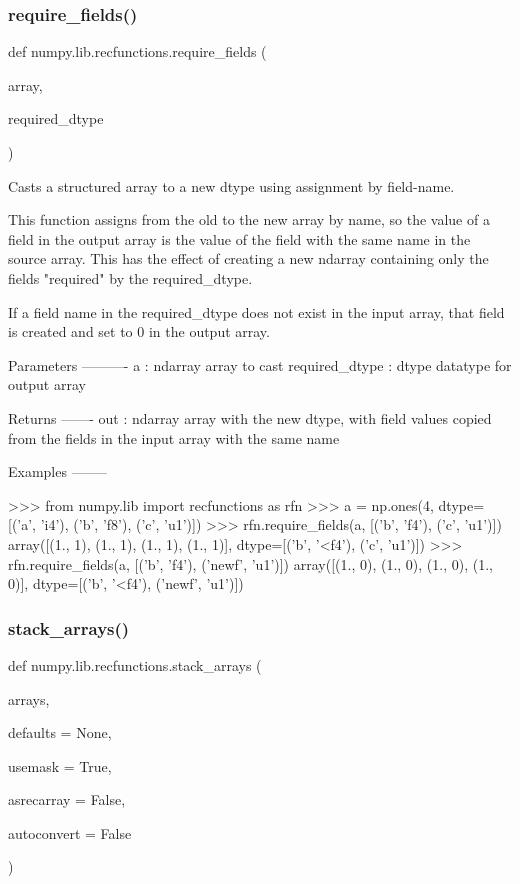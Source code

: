 \subsubsection{\texorpdfstring{require\+\_\+fields()}{require\_fields()}}
{\footnotesize\ttfamily def numpy.\+lib.\+recfunctions.\+require\+\_\+fields (\begin{DoxyParamCaption}\item[{}]{array,  }\item[{}]{required\+\_\+dtype }\end{DoxyParamCaption})}

\begin{DoxyVerb}Casts a structured array to a new dtype using assignment by field-name.

This function assigns from the old to the new array by name, so the
value of a field in the output array is the value of the field with the
same name in the source array. This has the effect of creating a new
ndarray containing only the fields "required" by the required_dtype.

If a field name in the required_dtype does not exist in the
input array, that field is created and set to 0 in the output array.

Parameters
----------
a : ndarray
   array to cast
required_dtype : dtype
   datatype for output array

Returns
-------
out : ndarray
    array with the new dtype, with field values copied from the fields in
    the input array with the same name

Examples
--------

>>> from numpy.lib import recfunctions as rfn
>>> a = np.ones(4, dtype=[('a', 'i4'), ('b', 'f8'), ('c', 'u1')])
>>> rfn.require_fields(a, [('b', 'f4'), ('c', 'u1')])
array([(1., 1), (1., 1), (1., 1), (1., 1)],
  dtype=[('b', '<f4'), ('c', 'u1')])
>>> rfn.require_fields(a, [('b', 'f4'), ('newf', 'u1')])
array([(1., 0), (1., 0), (1., 0), (1., 0)],
  dtype=[('b', '<f4'), ('newf', 'u1')])\end{DoxyVerb}
 \mbox{\label{namespacenumpy_1_1lib_1_1recfunctions_a79ff6ab96bbc7e0764d3754dedd7bf28}} 
\subsubsection{\texorpdfstring{stack\+\_\+arrays()}{stack\_arrays()}}
{\footnotesize\ttfamily def numpy.\+lib.\+recfunctions.\+stack\+\_\+arrays (\begin{DoxyParamCaption}\item[{}]{arrays,  }\item[{}]{defaults = {\ttfamily None},  }\item[{}]{usemask = {\ttfamily True},  }\item[{}]{asrecarray = {\ttfamily False},  }\item[{}]{autoconvert = {\ttfamily False} }\end{DoxyParamCaption})}

